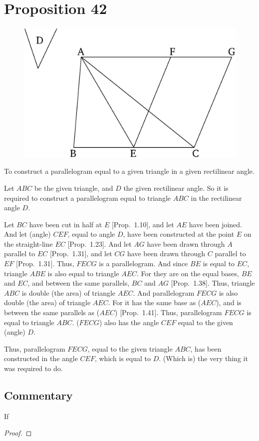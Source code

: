 \chapter*{Proposition 42}



\begin{figure}[ht]
    \begin{center}
    \includegraphics[width=0.5\linewidth]{figures/fig42e.eps}
    \label{fig:prop_42}
    \end{center}
\end{figure}

To construct a parallelogram equal to a given triangle in a given
rectilinear angle.

Let $ABC$ be the given triangle, and $D$ the given rectilinear angle. So
it is required to construct a parallelogram equal to triangle $ABC$
in the rectilinear angle $D$.

Let $BC$ have been cut in half at $E$ [Prop.~1.10], and let $AE$ have been joined. And let (angle) $CEF$, equal to angle $D$,  have been constructed
at the point $E$ on the straight-line $EC$ [Prop.~1.23]. And let $AG$ have been drawn through $A$
parallel to $EC$ [Prop.~1.31], and let $CG$ have been drawn through $C$ parallel
to $EF$ [Prop.~1.31]. Thus, $FECG$ is a parallelogram. And since $BE$ is
equal to $EC$, triangle $ABE$ is also equal to triangle $AEC$. For they are
on the equal bases, $BE$ and $EC$, and between the same parallels, $BC$ and $AG$ [Prop.~1.38]. Thus, triangle $ABC$ is double (the area) of triangle $AEC$. And
parallelogram $FECG$ is also double (the area) of triangle $AEC$. For it has the same base as ($AEC$), and is between the same parallels  as ($AEC$) [Prop.~1.41].
Thus, parallelogram $FECG$ is equal to triangle $ABC$.  ($FECG$) also has
the angle $CEF$ equal to the given (angle) $D$.

Thus, parallelogram $FECG$,  equal to the given
triangle $ABC$, has been constructed in the angle $CEF$, which is equal to $D$. (Which is) the
very thing it was required to do.


\section*{Commentary}

\begin{proposition}\label{proposition_42}\leanok
    If
\end{proposition}
\begin{proof}
    \leanok
\end{proof}
